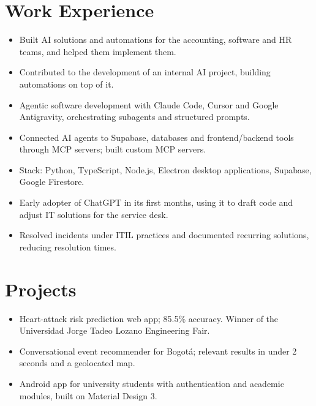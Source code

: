 \section{Work Experience}
\begin{itemize}
  \item Built AI solutions and automations for the accounting, software and HR teams, and helped them implement them.
  \item Contributed to the development of an internal AI project, building automations on top of it.
  \item Agentic software development with Claude Code, Cursor and Google Antigravity, orchestrating subagents and structured prompts.
  \item Connected AI agents to Supabase, databases and frontend/backend tools through MCP servers; built custom MCP servers.
  \item Stack: Python, TypeScript, Node.js, Electron desktop applications, Supabase, Google Firestore.
\end{itemize}

\begin{itemize}
  \item Early adopter of ChatGPT in its first months, using it to draft code and adjust IT solutions for the service desk.
  \item Resolved incidents under ITIL practices and documented recurring solutions, reducing resolution times.
\end{itemize}

\section{Projects}
\begin{itemize}
  \item Heart-attack risk prediction web app; 85.5\% accuracy. Winner of the Universidad Jorge Tadeo Lozano Engineering Fair.
\end{itemize}
\begin{itemize}
  \item Conversational event recommender for Bogotá; relevant results in under 2 seconds and a geolocated map.
\end{itemize}
\begin{itemize}
  \item Android app for university students with authentication and academic modules, built on Material Design 3.
\end{itemize}


